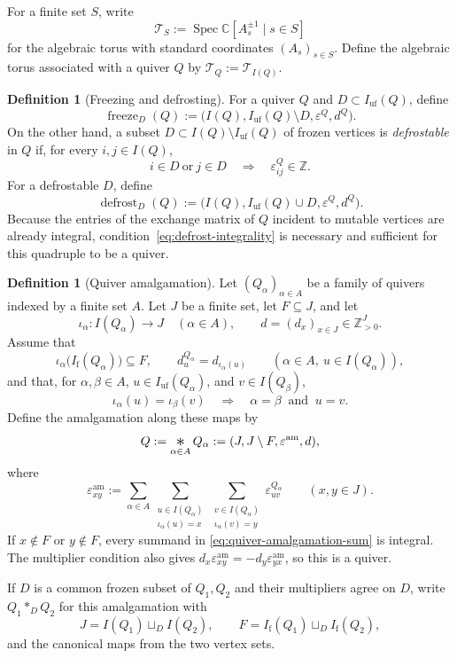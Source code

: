 \documentclass[10pt,a4paper]{article}
\theoremstyle{definition}
\newtheorem{definition}[theorem]{Definition}
\theoremstyle{remark}
\newcommand{\Tcal}{\mathcal T}
\newcommand{\eps}{\varepsilon}
\newcommand{\bigast}{\mathop{\vcenter{\hbox{\Large\(\ast\)}}}\displaylimits}
\begin{document}
For a finite set \(S\), write
\[
 \Tcal_S
 :=
 \operatorname{Spec}
 \mathbb C[A_s^{\pm1}\mid s\in S]
\]
for the algebraic torus with standard coordinates \((A_s)_{s\in S}\).  Define
the algebraic torus associated with a quiver \(Q\) by
\(\Tcal_Q:=\Tcal_{I(Q)}\).

\begin{definition}[Freezing and defrosting]
\label{def:freeze-defrost}
For a quiver \(Q\) and \(D\subset I_{\mathrm{uf}}(Q)\), define
\[
 \operatorname{freeze}_D(Q)
 :=\bigl(I(Q),I_{\mathrm{uf}}(Q)\setminus D,\eps^Q,d^Q\bigr).
\]
On the other hand, a subset \(D\subset I(Q)\setminus I_{\mathrm{uf}}(Q)\) of
frozen vertices is \emph{defrostable} in \(Q\) if, for every
\(i,j\in I(Q)\),
\begin{equation}
 i\in D\ \text{or}\ j\in D
 \quad\Longrightarrow\quad \eps^Q_{ij}\in\mathbb Z.
 \label{eq:defrost-integrality}
\end{equation}
For a defrostable \(D\), define
\[
 \operatorname{defrost}_D(Q)
 :=\bigl(I(Q),I_{\mathrm{uf}}(Q)\cup D,\eps^Q,d^Q\bigr).
\]
Because the entries of the exchange matrix of \(Q\) incident to mutable
vertices are already integral, condition~\eqref{eq:defrost-integrality} is
necessary and sufficient for this quadruple to be a quiver.
\end{definition}

\begin{definition}[Quiver amalgamation]
\label{def:quiver-amalgamation}
Let \((Q_\alpha)_{\alpha\in A}\) be a family of quivers indexed by a finite
set \(A\).  Let \(J\) be a finite set, let \(F\subseteq J\), and let
\[
 \iota_\alpha:I(Q_\alpha)\longrightarrow J
 \quad(\alpha\in A),
 \qquad
 d=(d_x)_{x\in J}\in\mathbb Z_{>0}^{J}.
\]
Assume that
\[
 \iota_\alpha\bigl(I_{\mathrm f}(Q_\alpha)\bigr)\subseteq F,
 \qquad
 d^{Q_\alpha}_u=d_{\iota_\alpha(u)}
 \qquad(\alpha\in A,\ u\in I(Q_\alpha)),
\]
and that, for \(\alpha,\beta\in A\),
\(u\in I_{\mathrm{uf}}(Q_\alpha)\), and \(v\in I(Q_\beta)\),
\[
 \iota_\alpha(u)=\iota_\beta(v)
 \quad\Longrightarrow\quad
 \alpha=\beta\ \text{ and }\ u=v.
\]
Define the amalgamation along these maps by
\[
 Q:=\bigast_{\alpha\in A}Q_\alpha
 :=(J,J\setminus F,\eps^{\mathrm{am}},d),
\]
where
\begin{equation}
 \eps^{\mathrm{am}}_{xy}
 :=
 \sum_{\alpha\in A}
 \sum_{\substack{u\in I(Q_\alpha)\\ \iota_\alpha(u)=x}}
 \sum_{\substack{v\in I(Q_\alpha)\\ \iota_\alpha(v)=y}}
 \eps^{Q_\alpha}_{uv}
 \qquad(x,y\in J).
 \label{eq:quiver-amalgamation-sum}
\end{equation}
If \(x\notin F\) or \(y\notin F\), every summand in
\eqref{eq:quiver-amalgamation-sum} is integral.  The multiplier condition also
gives
\(d_x\eps^{\mathrm{am}}_{xy}=-d_y\eps^{\mathrm{am}}_{yx}\), so this is a
quiver.

If \(D\) is a common frozen subset of \(Q_1,Q_2\) and their multipliers agree
on \(D\), write \(Q_1\ast_DQ_2\) for this amalgamation with
\[
 J=I(Q_1)\sqcup_D I(Q_2),
 \qquad
 F=I_{\mathrm f}(Q_1)\sqcup_D I_{\mathrm f}(Q_2),
\]
and the canonical maps from the two vertex sets.
\end{definition}
\end{document}
